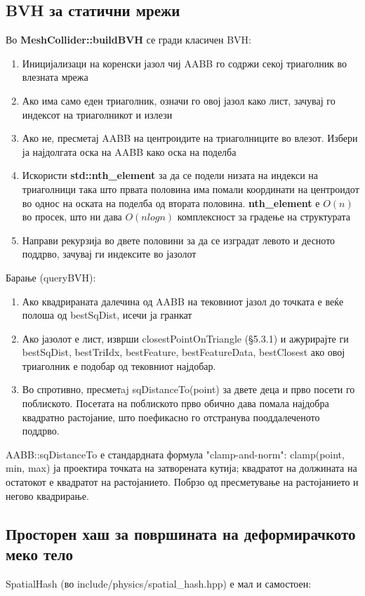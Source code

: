 \subsection{BVH за статични мрежи}
Во \textbf{MeshCollider::buildBVH} се гради класичен BVH:
	\begin{enumerate}
		\item Иницијализаци на коренски јазол чиј AABB го содржи секој триаголник во влезната мрежа
		\item Ако има само еден триаголник, означи го овој јазол како лист, зачувај го индексот на триаголникот и излези
		\item Ако не, пресметај AABB на центроидите на триаголниците во влезот. Избери ја најдолгата оска на AABB како оска на поделба
		\item Искористи \textbf{std::nth\_element} за да се подели низата на индекси на триаголници така што првата половина има помали координати на центроидот во однос на оската на поделба од втората половина. \textbf{nth\_element} е $O(n)$ во просек, што ни дава $O(nlogn)$ комплексност за градење на структурата
		\item Направи рекурзија во двете половини за да се изградат левото и десното поддрво, зачувај ги индексите во јазолот
	\end{enumerate}

	
Барање (queryBVH):

\begin{enumerate}
	\item Ако квадрираната далечина од AABB на тековниот јазол до точката е веќе полоша од bestSqDist, исечи ја гранкат
	\item Ако јазолот е лист, изврши closestPointOnTriangle (§5.3.1) и ажурирајте ги bestSqDist, bestTriIdx, bestFeature, bestFeatureData, bestClosest ако овој триаголник е подобар од тековниот најдобар.
	\item Во спротивно, пресметaj sqDistanceTo(point) за двете деца и прво посети  го поблиското. Посетата на поблиското прво обично дава помала најдобра квадратно растојание, што поефикасно го отстранува пооддалеченото поддрво.
\end{enumerate}


AABB::sqDistanceTo е стандардната формула "clamp-and-norm": clamp(point, min, max) ја проектира точката на затворената кутија; квадратот на должината на остатокот е квадратот на растојанието. Побрзо од пресметување на растојанието и негово квадрирање.

\subsection{Просторен хаш за површината на деформирачкото меко тело}
SpatialHash (во include/physics/spatial\_hash.hpp) е мал и самостоен:

